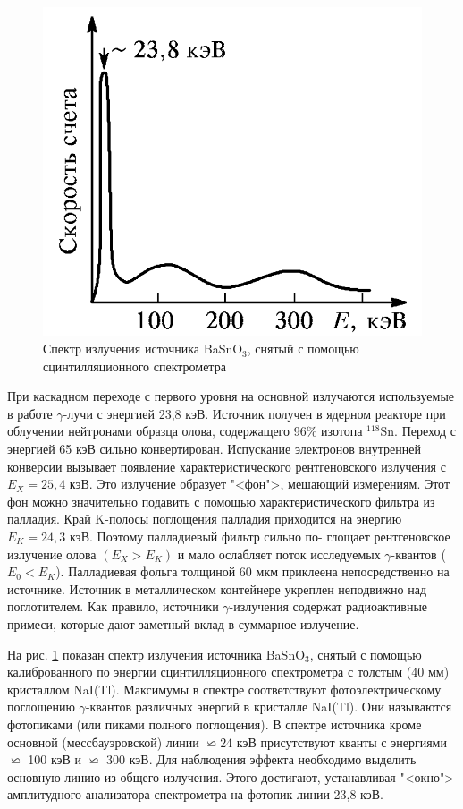 \documentclass[12pt]{kiarticle} %
\begin{document}
	\begin{figure}
		\includegraphics[width=\linewidth]{spek_lab}
		\caption{Спектр излучения источника BaSnO$_3 $, снятый с
			помощью сцинтилляционного спектрометра}
		\label{spek_lab}
	\end{figure}
	
	
	При каскадном переходе с первого
	уровня на основной излучаются используемые в работе $ \gamma $-лучи с энергией 23,8 кэВ.
	Источник получен в ядерном реакторе при
	облучении нейтронами образца олова, содержащего 96\% изотопа
	$ ^{118} $Sn. Переход с энергией 65 кэВ сильно конвертирован. Испускание электронов внутренней конверсии вызывает появление характеристического рентгеновского излучения с $ E_X = 25,4 $ кэВ. Это излучение образует "<фон">, мешающий измерениям. Этот фон можно значительно подавить с помощью характеристического фильтра
	из палладия. Край K-полосы поглощения палладия приходится на
	энергию $ E_K = 24,3 $ кэВ. Поэтому палладиевый фильтр сильно по-
	глощает рентгеновское излучение олова $ (E_X > E_K) $ и мало ослабляет поток исследуемых $ \gamma $-квантов ($ E_0 < E_K $). Палладиевая фольга
	толщиной 60 мкм приклеена непосредственно на источнике. Источник в металлическом контейнере укреплен неподвижно над поглотителем. Как правило, источники $ \gamma $-излучения содержат радиоактивные примеси, которые дают заметный вклад в суммарное излучение.

	На рис. \ref{spek_lab} показан спектр излучения источника BaSnO$_3 $, снятый с помощью калиброванного по энергии сцинтилляционного спектрометра с толстым (40 мм) кристаллом NaI(Tl). Максимумы в спектре
	соответствуют фотоэлектрическому поглощению $ \gamma $-квантов различных энергий в кристалле NaI(Tl). Они называются фотопиками (или
	пиками полного поглощения). В спектре источника кроме основной
	(мессбауэровской) линии $ \backsimeq 24 $ кэВ присутствуют кванты с энергиями $ \backsimeq $ 100 кэВ и $ \backsimeq  $ 300 кэВ. Для наблюдения эффекта необходимо выделить основную линию из общего излучения. Этого достигают, устанавливая "<окно"> амплитудного анализатора спектрометра на фотопик линии 23,8 кэВ.
	
\end{document}
